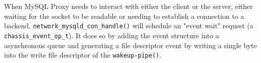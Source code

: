 When MySQL Proxy needs to interact with either the client or the server, either waiting for the socket to be readable or needing to 
establish a connection to a backend, \texttt{network\_mysqld\_con\_handle()} will schedule an "event wait" request (a \texttt{chassis\_event\-\_op\_t}). It does so by 
adding the event structure into a asynchronous queue and generating a file descriptor event by writing a single byte into the write file descriptor of the 
\texttt{wakeup-pipe()}.


\begin{comment}

\subsubsection{Signaling all threads for new events requests}

That pipe is a common hack in libevent to map any kind of event to a the fd-based event-handlers like poll:
\begin{itemize}
	\item the \texttt{event\_base\_dispatch()} blocks until a fd-event triggers
	\item timers, signals, ... can't interrupt \texttt{event\_base\_dispatch()} directly
	\item instead they cause a \texttt{write(pipe\_fd, ".", 1);} which triggers a fd-event which afterwards gets handled
\end{itemize}

In chassis-event-thread.c we use the pipe to signal that something is in the global event-queue to be
processed by one of the event-threads ... see chassis\_event\_handle(). All idling threads will process
that even and will pull from the event queue in parallel to add the event to their events to listen for.

To add a event to the event-queue you can call chassis\_event\_add() or chassis\_event\_add\_local(). In general
all events are handled by the global event base, only in the case where we use the connection pool we force
events for the server connection to be delivered to the same thread that added it to the pool.

If the event would be delivered to the global event base a different thread could pick it up and that would
modify the unprotected connection pool data structure, leading to race conditions and crashes. Making the
internal data structures thread safe is part of the 0.9 release cycle, thus only the minimal amount of
thread safety is guaranteed right now.


\end{comment}
